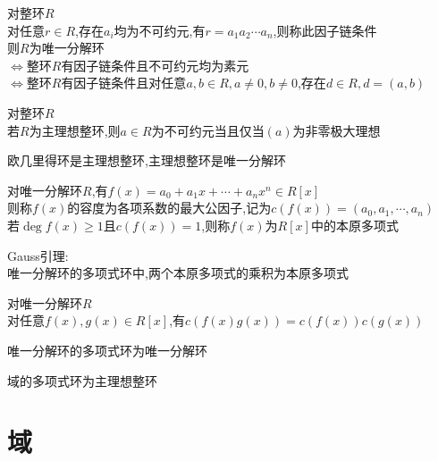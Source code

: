 \begin{dingli}
对整环$R$\\
对任意$r\in R$,存在$a_i$均为不可约元,有$r=a_1a_2\cdots a_n$,则称此因子链条件\\
则$R$为唯一分解环\\
$\Leftrightarrow$整环$R$有因子链条件且不可约元均为素元\\
$\Leftrightarrow$整环$R$有因子链条件且对任意$a,b\in R,a\neq 0,b\neq 0$,存在$d\in R,d=(a,b)$
\end{dingli}

\begin{dingli}
对整环$R$\\
若$R$为主理想整环,则$a\in R$为不可约元当且仅当$(a)$为非零极大理想
\end{dingli}

\begin{dingli}
欧几里得环是主理想整环,主理想整环是唯一分解环
\end{dingli}

\begin{dingyi}
对唯一分解环$R$,有$f(x)=a_0+a_1x+\cdots+a_nx^n\in R[x]$\\
则称$f(x)$的容度为各项系数的最大公因子,记为$c(f(x))=(a_0,a_1,\cdots,a_n)$\\
若$\deg f(x)\geq 1$且$c(f(x))=1$,则称$f(x)$为$R[x]$中的本原多项式
\end{dingyi}

\begin{dingli}
Gauss引理:\\
唯一分解环的多项式环中,两个本原多项式的乘积为本原多项式
\end{dingli}

\begin{tuilun}
对唯一分解环$R$\\
对任意$f(x),g(x)\in R[x]$,有$c(f(x)g(x))=c(f(x))c(g(x))$
\end{tuilun}

\begin{dingli}
唯一分解环的多项式环为唯一分解环
\end{dingli}

\begin{dingli}
域的多项式环为主理想整环
\end{dingli}

\chapter{域}

